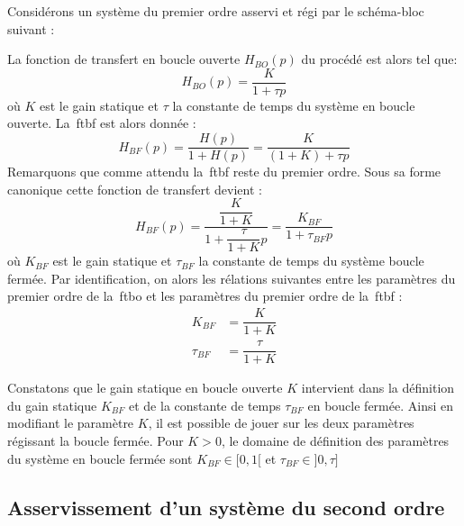 Considérons un système du premier ordre asservi et régi par le schéma-bloc suivant :
\begin{center}
\end{center}
La fonction de transfert en boucle ouverte $H_{BO}(p)$ du procédé est alors tel que:
$$
H_{BO}(p)=\dfrac{K}{1+\tau p}
$$
où $K$ est le gain statique et $\tau$ la constante de temps 
du système en boucle ouverte. 
La~\gls{ftbf} est alors donnée :
$$
H_{BF}(p)=\dfrac{H(p)}{1+H(p)}=\dfrac{K}{(1+K)+\tau p}
$$
Remarquons que comme attendu la~\gls{ftbf} reste du premier ordre. 
Sous sa forme canonique cette fonction de transfert devient :
$$
H_{BF}(p)=\dfrac{\dfrac{K}{1+K}}{1+\dfrac{\tau}{1+K}p}=\dfrac{K_{BF}}{1+\tau_{BF} p}
$$
où $K_{BF}$ est le gain statique et $\tau_{BF}$ la constante de temps du système boucle fermée.
Par identification, on alors les rélations suivantes entre les paramètres du premier ordre 
de la~\gls{ftbo} et les paramètres du premier ordre de la~\gls{ftbf} :
\begin{align*}
       K_{BF}&=\dfrac{K}{1+K}\\
    \tau_{BF}&=\dfrac{\tau}{1+K}
\end{align*}

Constatons que le gain statique en boucle ouverte $K$ intervient 
dans la définition du gain statique $K_{BF}$ et de la constante de temps $\tau_{BF}$ en boucle fermée. 
Ainsi en modifiant le paramètre $K$, il est possible de jouer sur les deux paramètres régissant la boucle fermée.
Pour $K>0$, le domaine de définition des paramètres du système en boucle fermée sont  $K_{BF}\in[0,1[$ et  $\tau_{BF}\in]0,\tau]$

\subsection{Asservissement d'un système du second ordre}

